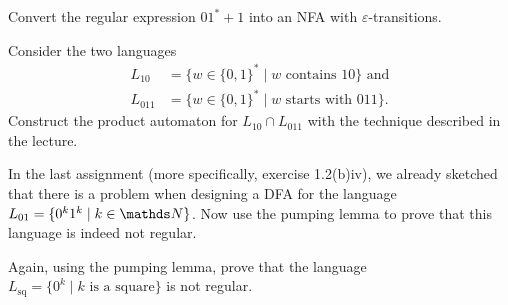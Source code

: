 \documentclass{exercise}
\begin{document}

\subtask Convert the regular expression $01^*+1$ into an NFA with
  $\varepsilon$-transitions.



Consider the two languages
\begin{align*}
  L_{10}  &= \{w \in \{0,1\}^* \mid w \text{ contains } 10\} \text{ and} \\
  L_{011} &= \{w \in \{0,1\}^* \mid w \text{ starts with } 011 \}.
\end{align*}
Construct the product automaton for $L_{10}\cap L_{011}$ with the technique
described in the lecture.



\subtask In the last assignment (more specifically, exercise 1.2(b)iv), we
  already sketched that there is a problem when designing a DFA for the
  language $L_{01}=\{0^k1^k \mid k \in \nat\}$.  Now use the pumping lemma
  to prove that this language is indeed not regular.


\subtask Again, using the pumping lemma, prove that the language
  $L_{\text{sq}}=\{0^k \mid k \text{ is a square}\}$ is not regular.

\end{document}
